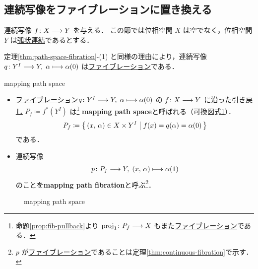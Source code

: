 \documentclass[algtopo_main]{subfiles}
\begin{document}
\subsection{連続写像をファイブレーションに置き換える}

連続写像 $f \colon X \longrightarrow Y$ を与える．
この節では位相空間 $X$ は空でなく，位相空間 $Y$ は\underline{弧状連結}であるとする．

定理\ref{thm:path-space-fibration}-(1) と同様の理由により，連続写像 $q \colon Y^I \longrightarrow Y,\; \alpha \longmapsto \alpha(0)$ は\hyperref[def:fibration]{ファイブレーション}である．

\begin{mydef}[label=def:mapping-path-space]{mapping path space}
    \begin{itemize}
        \item \hyperref[def:fibration]{ファイブレーション}$q \colon Y^I \longrightarrow Y,\; \alpha \longmapsto \alpha(0)$ の $f \colon X \longrightarrow Y$ に沿った\hyperref[def:fib-pullback]{引き戻し} $P_f \coloneqq f^*(Y^I)$ は\footnote{命題\ref{prop:fib-pullback}より $\mathrm{proj}_1 \colon P_f \longrightarrow X$ もまた\hyperref[def:fibration]{ファイブレーション}である．} \textbf{mapping path space}と呼ばれる（可換図式\ref{cmtd:MPS}）．
        \begin{align}
            P_f \coloneqq \bigl\{\, (x,\, \alpha) \in X \times Y^I\bigm| f(x) = q(\alpha) = \alpha(0) \,\bigr\} 
        \end{align}
        である．
        \item 連続写像
        \begin{align}
            p\colon P_f \longrightarrow Y,\; (x,\, \alpha) \longmapsto \alpha(1)
        \end{align}
        のことを\textbf{mapping path fibration}と呼ぶ\footnote{$p$ が\hyperref[def:fibration]{ファイブレーション}であることは定理\ref{thm:continuous-fibration}で示す．}．
    \end{itemize}
\end{mydef}

\begin{figure}[H]
    \centering
    \caption{mapping path space}
    \label{cmtd:MPS}
\end{figure}%
\end{document}
